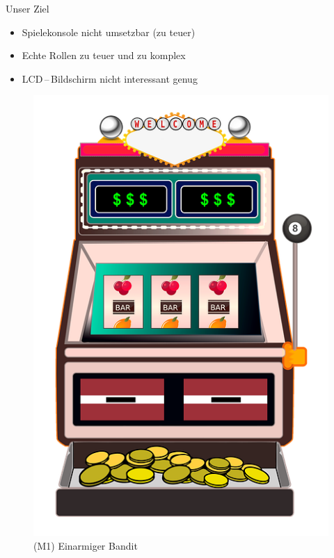 \documentclass[mathserif,9pt]{article}
\begin{document}
    \begin{frame}{Unser Ziel}
        \begin{block}{} %
           \begin{minipage}[c]{0.6\textwidth}
            \begin{itemize}
                \item Spielekonsole nicht umsetzbar (zu teuer)
                \item Echte Rollen zu teuer und zu komplex
                \item LCD\,--\,Bildschirm nicht interessant genug
            \end{itemize}
            \end{minipage}
            \hfill
            \begin{minipage}[c]{0.35\textwidth}
                \begin{figure}
                    \centering
                    \includegraphics[width=\textwidth]{img/slot-machine.png}
                    \caption[M1]{(M1) Einarmiger Bandit}
                    \label{fig:slot_mashine}
                \end{figure}
            \end{minipage}
        \end{block}
    \end{frame}
\end{document}
